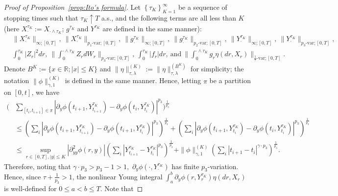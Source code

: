 \documentclass[11pt,reqno]{amsart}
\def\R{\mathbb R}
\numberwithin{equation}{section}
\begin{document}
\begin{proof}[Proof of Proposition~\ref{prop:Ito's formula}]
Let $\left\{\tau_{K}\right\}_{K=1}^{\infty}$   be a sequence of stopping times such that $\tau_{K} \uparrow T$ a.s., and the following terms are all less than $K$ (here $X^{\tau_{K}}_{\cdot} := X_{\cdot\land\tau_{K}}$; $g^{\tau_{K}}$ and $Y^{\tau_{K}}$ are defined in the same manner):
\begin{equation*}
\begin{aligned}
&\|X^{\tau_{K}}_{\cdot}\|_{\infty;[0,T]},\ \|X^{\tau_{K}}_{\cdot}\|_{p_{1}\text{-var};[0,T]},\ \|g^{\tau_{K}}_{\cdot}\|_{\infty;[0,T]},\ \|g^{\tau_{K}}_{\cdot}\|_{p_{2}\text{-var};[0,T]},\ \|Y^{\tau_{K}}_{\cdot}\|_{\infty;[0,T]},\ \|Y^{\tau_{K}}_{\cdot}\|_{p_{3}\text{-var};[0,T]},\\
&\int_{0}^{\tau_{K}}|Z_{r}|^{2}dr,\ \Big\|\int_{0}^{\cdot\land\tau_{K}}Z_{r}dW_{r}\Big\|_{p_{3}\text{-var};[0,T]},\ \int_{0}^{\tau_{K}}|f_{r}|dr,\ \text{and}\ \Big\|\int_{0}^{\cdot\land \tau_{K}}g_{r}\eta(dr,X_{r})\Big\|_{\frac{1}{\tau}\text{-var};[0,T]}.
\end{aligned}
\end{equation*}
Denote $B^{K}:=\{x\in\R;|x|\le K\}$ and  $\|\eta\|^{(K)}_{\tau,\lambda} := \|\eta\|^{(B^{K})}_{\tau,\lambda}$ for simplicity; the notation $\|\phi\|^{(K)}_{\gamma,1}$ is defined in the same manner. Hence, letting $\pi$ be a partition on $[0,t]$, we have 
\begin{equation*}
\begin{aligned}
\Bigg(&\sum_{[t_{i},t_{i+1}]\in\pi}\left|\partial_{y}\phi(t_{i+1},Y^{\tau_{K}}_{t_{i+1}}) - \partial_{y}\phi(t_{i},Y^{\tau_{K}}_{t_{i}})\right|^{p_{3}}\Bigg)^{\frac{1}{p_{3}}}\\
&\le \left(\sum_{i}\left|\partial_{y}\phi(t_{i+1},Y^{\tau_{K}}_{t_{i+1}}) - \partial_{y}\phi(t_{i+1},Y^{\tau_{K}}_{t_{i}})\right|^{p_{3}}\right)^{\frac{1}{p_{3}}} + \left(\sum_{i}\left|\partial_{y}\phi(t_{i+1},Y^{\tau_{K}}_{t_{i}}) - \partial_{y}\phi(t_{i},Y^{\tau_{K}}_{t_{i}})\right|^{p_{3}}\right)^{\frac{1}{p_{3}}}\\
&\le \sup_{r\in[0,T],|y|\le K} |\partial^{2}_{yy}\phi(r,y)|\left(\sum_{i}\left|Y^{\tau_{K}}_{t_{i+1}} - Y^{\tau_{K}}_{t_{i}}\right|^{p_{3}}\right)^{\frac{1}{p_{3}}} + \|\phi\|^{(K)}_{\gamma,1} \left(\sum_{i}\left|t_{i+1}-t_{i}\right|^{\gamma \cdot p_{3}}\right)^{\frac{1}{p_{3}}}.
\end{aligned}
\end{equation*}
Therefore, noting that $\gamma\cdot p_{3} > p_{3} - 1 > 1,$  $\partial_{y}\phi(\cdot,Y^{\tau_{K}}_{\cdot})$ has finite $p_{3}$-variation. Hence, since $\tau + \frac{1}{p_{3}}>1$, the nonlinear Young integral $\int_{a}^{b}\partial_{y}\phi(r,Y^{\tau_{K}}_{r})\eta(dr,X_{r})$ is well-defined for $0\le a <b \le T$. Note that

\end{proof}
\end{document}

